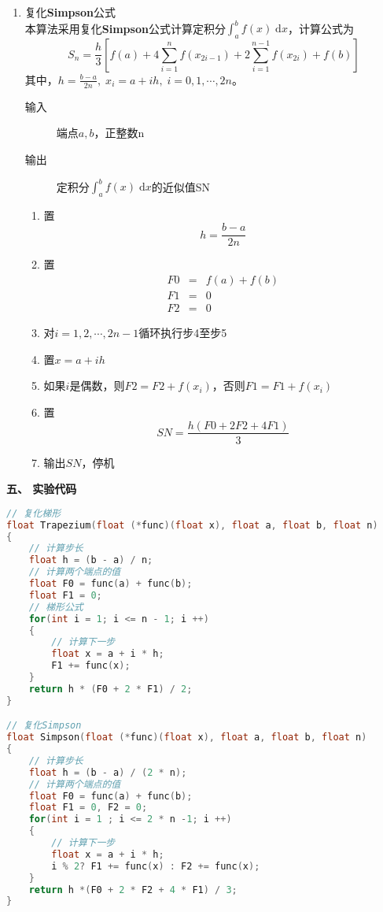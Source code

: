 \documentclass[a4paper,11pt]{article}
\begin{document}
\begin{enumerate}
		\item 复化\textbf{Simpson}公式\\
			本算法采用复化\textbf{Simpson}公式计算定积分$\int_{a}^{b}f(x)\;\mathrm{d}x$，计算公式为
			\begin{displaymath}
				S_{n}=\frac{h}{3}\left[f(a)+4\sum\limits_{i=1}^{n}f(x_{2i-1})+2\sum\limits_{i=1}^{n-1}f(x_{2i})+f(b)\right]
			\end{displaymath}
			其中，$h=\frac{b-a}{2n},\;x_i=a+ih,\;i=0,1,\cdots,2n$。
			\begin{description}
				\item[输入 ] 端点$a,b$，正整数n
				\item[输出 ] 定积分$\int_{a}^{b}f(x)\;\mathrm{d}x$的近似值SN
			\end{description}
			\begin{enumerate}[(1)]
			\item 置
				\begin{displaymath}
					h=\frac{b-a}{2n}
				\end{displaymath}
			\item 置
				\begin{eqnarray}
					F0 & = & f(a)+f(b)\nonumber\\
					F1 & = & 0\nonumber\\
					F2 & = & 0\nonumber
				\end{eqnarray}
			\item 对$i=1,2,\cdots,2n-1$循环执行步4至步5
			\item 置$x=a+ih$
			\item 如果$i$是偶数，则$F2=F2+f(x_i)$，否则$F1=F1+f(x_i)$
			\item 置
				\begin{displaymath}
					SN=\frac{h(F0+2F2+4F1)}{3}
				\end{displaymath}
			\item 输出$SN$，停机
		\end{enumerate}
	\end{enumerate}
\begin{Large}
	\textbf{五、 实验代码}
\end{Large}
\begin{spacing}{1.0}
	\begin{lstlisting}[language=C++]
// 复化梯形
float Trapezium(float (*func)(float x), float a, float b, float n)
{
    // 计算步长
    float h = (b - a) / n;
    // 计算两个端点的值
    float F0 = func(a) + func(b);
    float F1 = 0;
    // 梯形公式
    for(int i = 1; i <= n - 1; i ++)
    {
        // 计算下一步
        float x = a + i * h;
        F1 += func(x);
    }
    return h * (F0 + 2 * F1) / 2;
}

// 复化Simpson
float Simpson(float (*func)(float x), float a, float b, float n)
{
    // 计算步长
    float h = (b - a) / (2 * n);
    // 计算两个端点的值
    float F0 = func(a) + func(b);
    float F1 = 0, F2 = 0;
    for(int i = 1 ; i <= 2 * n -1; i ++)
    {
        // 计算下一步
        float x = a + i * h;
        i % 2? F1 += func(x) : F2 += func(x);
    }
    return h *(F0 + 2 * F2 + 4 * F1) / 3;
}
	\end{lstlisting}
\end{spacing}
\end{document}
